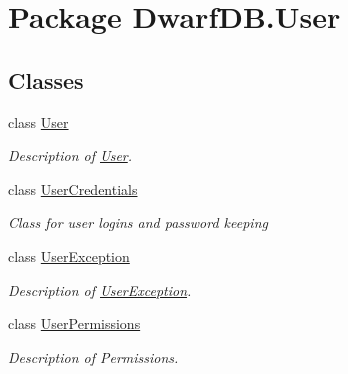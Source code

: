 \hypertarget{namespace_dwarf_d_b_1_1_user}{\section{Package Dwarf\+D\+B.\+User}
\label{namespace_dwarf_d_b_1_1_user}
}
\subsection*{Classes}
\begin{DoxyCompactItemize}
\item 
class \hyperlink{class_dwarf_d_b_1_1_user_1_1_user}{User}
\begin{DoxyCompactList}\small\item\em Description of \hyperlink{class_dwarf_d_b_1_1_user_1_1_user}{User}. \end{DoxyCompactList}\item 
class \hyperlink{class_dwarf_d_b_1_1_user_1_1_user_credentials}{User\+Credentials}
\begin{DoxyCompactList}\small\item\em Class for user logins and password keeping \end{DoxyCompactList}\item 
class \hyperlink{class_dwarf_d_b_1_1_user_1_1_user_exception}{User\+Exception}
\begin{DoxyCompactList}\small\item\em Description of \hyperlink{class_dwarf_d_b_1_1_user_1_1_user_exception}{User\+Exception}. \end{DoxyCompactList}\item 
class \hyperlink{class_dwarf_d_b_1_1_user_1_1_user_permissions}{User\+Permissions}
\begin{DoxyCompactList}\small\item\em Description of Permissions. \end{DoxyCompactList}\end{DoxyCompactItemize}
